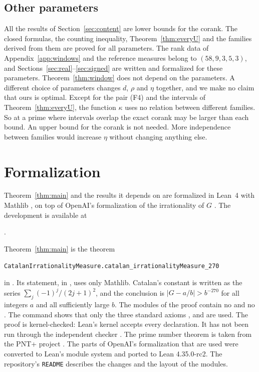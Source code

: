 \subsection{Other parameters}
All the results of Section~\ref{sec:content} are lower bounds for the corank. The closed formulas, the
counting inequality, Theorem~\ref{thm:everyU} and the families derived from them are proved for all
parameters. The rank data of Appendix~\ref{app:windows} and the reference measures belong to $(58,9,3,5,3)$, and
Sections~\ref{sec:real}--\ref{sec:signed} are written and formalized for these parameters. Theorem~\ref{thm:window} does not depend on
the parameters. A different choice of parameters changes $d$, $\rho$ and $\eta$ together, and we make no claim
that ours is optimal. Except for the pair (F4) and the intervals of Theorem~\ref{thm:everyU}, the function
$\kappa$ uses no relation between different families. So at a prime where intervals overlap the exact corank
may be larger than each bound. An upper bound for the corank is not needed. More independence between
families would increase $\eta$ without changing anything else.

\section{Formalization}\label{sec:formal}

Theorem~\ref{thm:main} and the results it depends on are formalized in Lean~4 \cite{Lean4} with Mathlib \cite{Mathlib}, on top of OpenAI's
formalization of the irrationality of $G$ \cite{OpenAI2026}. The development is available at
\begin{center}
\FormalizationLink.
\end{center}
Theorem~\ref{thm:main} is the theorem
\begin{center}
{\small\texttt{CatalanIrrationalityMeasure.catalan\_irrationalityMeasure\_270}}
\end{center}
in . Its statement, in , uses only Mathlib. Catalan's constant is
written as the series $\sum_j(-1)^j/(2j+1)^2$, and the conclusion is $|G-a/b|>b^{-270}$ for all integers $a$
and all sufficiently large $b$. The modules of the proof contain no  and no . The command
 shows that only the three standard axioms ,  and
 are used. The proof is kernel-checked: Lean's kernel accepts every declaration. It has not been run through the independent checker  \cite{Comparator}.
The prime number theorem is taken from the PNT+ project \cite{PNTPlus}. The parts of
OpenAI's formalization that are used were converted to Lean's module system and ported to Lean
4.35.0-rc2. The repository's \texttt{README} describes the changes and the layout of the modules.

